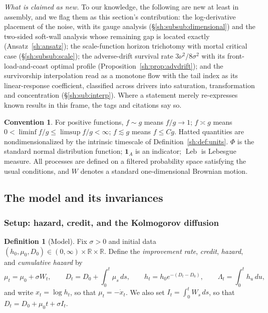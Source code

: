 \documentclass[11pt]{article}
\numberwithin{equation}{section}
\theoremstyle{plain}
\theoremstyle{definition}
\newtheorem{definition}[theorem]{Definition}
\newtheorem{convention}[theorem]{Convention}
\theoremstyle{remark}
\newcommand{\R}{\mathbb{R}}
\DeclareMathOperator{\Leb}{Leb}
\newcommand{\one}{\mathbf{1}}
\begin{document}
\emph{What is claimed as new.} To our knowledge, the following are new
at least in assembly, and we flag them as this section's contribution:
the log-derivative placement of the noise, with its gauge analysis
(\S\ref{sh:subsub:dimensional}) and the two-sided soft-wall analysis
whose remaining gap is located exactly (Ansatz~\ref{sh:ansatz}); the
scale-function horizon trichotomy with mortal critical case
(\S\ref{sh:subsub:scale}); the adverse-drift survival rate
$3\nu^2/8\sigma^2$ with its front-load-and-coast optimal profile
(Proposition~\ref{sh:prop:advdrift}); and the survivorship
interpolation read as a monotone flow with the tail index as its
linear-response coefficient, classified across drivers into saturation,
transformation and concentration (\S\ref{sh:sub:interp}). Where a
statement merely re-expresses known results in this frame, the tags and
citations say so.

\begin{convention}\label{sh:conv}
For positive functions, $f\sim g$ means $f/g\to1$; $f\asymp g$ means
$0<\liminf f/g\le\limsup f/g<\infty$; $f\lesssim g$ means $f\le Cg$.
Hatted quantities are nondimensionalized by the intrinsic timescale of
Definition~\ref{sh:def:units}. $\Phi$ is the standard normal distribution
function; $\one_A$ is an indicator; $\Leb$ is Lebesgue measure. All processes
are defined on a filtered probability space satisfying the usual conditions,
and $W$ denotes a standard one-dimensional Brownian motion.
\end{convention}

\subsection{The model and its invariances}\label{sh:sub:model}

\subsubsection{Setup: hazard, credit, and the Kolmogorov diffusion}
\label{sh:subsub:setup}

\begin{definition}[Model]\label{sh:def:model}
Fix $\sigma>0$ and initial data $(h_0,\mu_0,D_0)\in(0,\infty)\times\R\times\R$.
Define the \emph{improvement rate}, \emph{credit}, \emph{hazard}, and
\emph{cumulative hazard} by
\begin{equation}\label{sh:eq:model}
\mu_t=\mu_0+\sigma W_t,\qquad
D_t=D_0+\int_0^t\mu_s\,ds,\qquad
h_t=h_0e^{-(D_t-D_0)},\qquad
\Lambda_t=\int_0^t h_u\,du,
\end{equation}
and write $x_t=\log h_t$, so that $\mu_t=-\dot x_t$. We also set
$I_t=\int_0^t W_s\,ds$, so that $D_t=D_0+\mu_0t+\sigma I_t$.
\end{definition}
\end{document}
